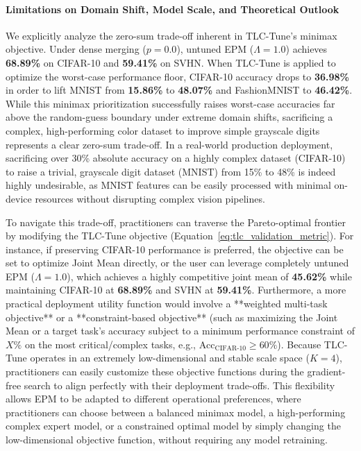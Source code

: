 \paragraph{Limitations on Domain Shift, Model Scale, and Theoretical Outlook}
We explicitly analyze the zero-sum trade-off inherent in TLC-Tune's minimax objective. Under dense merging ($p=0.0$), untuned EPM ($\Lambda = \mathbf{1.0}$) achieves \textbf{68.89\%} on CIFAR-10 and \textbf{59.41\%} on SVHN. When TLC-Tune is applied to optimize the worst-case performance floor, CIFAR-10 accuracy drops to \textbf{36.98\%} in order to lift MNIST from \textbf{15.86\%} to \textbf{48.07\%} and FashionMNIST to \textbf{46.42\%}. While this minimax prioritization successfully raises worst-case accuracies far above the random-guess boundary under extreme domain shifts, sacrificing a complex, high-performing color dataset to improve simple grayscale digits represents a clear zero-sum trade-off. In a real-world production deployment, sacrificing over 30\% absolute accuracy on a highly complex dataset (CIFAR-10) to raise a trivial, grayscale digit dataset (MNIST) from 15\% to 48\% is indeed highly undesirable, as MNIST features can be easily processed with minimal on-device resources without disrupting complex vision pipelines.

To navigate this trade-off, practitioners can traverse the Pareto-optimal frontier by modifying the TLC-Tune objective (Equation~\ref{eq:tlc_validation_metric}). For instance, if preserving CIFAR-10 performance is preferred, the objective can be set to optimize Joint Mean directly, or the user can leverage completely untuned EPM ($\Lambda = \mathbf{1.0}$), which achieves a highly competitive joint mean of \textbf{45.62\%} while maintaining CIFAR-10 at \textbf{68.89\%} and SVHN at \textbf{59.41\%}. Furthermore, a more practical deployment utility function would involve a **weighted multi-task objective** or a **constraint-based objective** (such as maximizing the Joint Mean or a target task's accuracy subject to a minimum performance constraint of $X\%$ on the most critical/complex tasks, e.g., $\text{Acc}_{\text{CIFAR-10}} \ge 60\%$). Because TLC-Tune operates in an extremely low-dimensional and stable scale space ($K=4$), practitioners can easily customize these objective functions during the gradient-free search to align perfectly with their deployment trade-offs. This flexibility allows EPM to be adapted to different operational preferences, where practitioners can choose between a balanced minimax model, a high-performing complex expert model, or a constrained optimal model by simply changing the low-dimensional objective function, without requiring any model retraining. 

